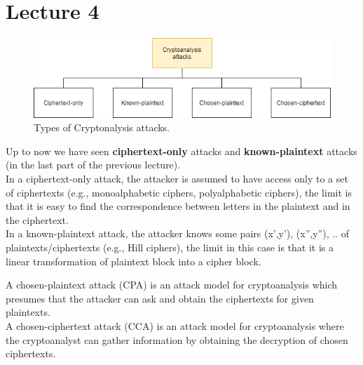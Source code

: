 \documentclass[a4paper, 12pt]{report}
\begin{document}
\chapter*{Lecture 4}

\begin{figure}[H]
	\centering
	\includegraphics[scale=0.7]{images/Lec4/typesofattacks.png}
	\caption{Types of Cryptonalysis attacks.}
	\label{fig:typesofattacks}
\end{figure}

Up to now we have seen \textbf{ciphertext-only} attacks and \textbf{known-plaintext} attacks (in the last part of the previous lecture).\\
In a ciphertext-only attack, the attacker is assumed to have access only to a set of ciphertexts (e.g., monoalphabetic ciphers, polyalphabetic ciphers), the limit is that it is easy to find the correspondence between letters in the plaintext and in the ciphertext.\\
In a known-plaintext attack, the attacker knows some pairs (x',y'), (x'',y''), .. of plaintexts/ciphertexts (e.g., Hill ciphers), the limit in this case is that it is a linear transformation of plaintext block into a cipher block.

A chosen-plaintext attack (CPA) is an attack model for cryptoanalysis which presumes that the attacker can ask and obtain the ciphertexts for given plaintexts.\\
A chosen-ciphertext attack (CCA) is an attack model for cryptoanalysis where the cryptoanalyst can gather information by obtaining the decryption of chosen ciphertexts.
\end{document}
